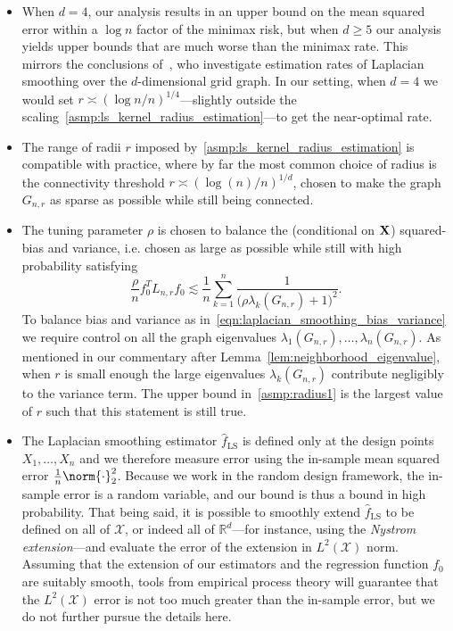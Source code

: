 \documentclass{article}
\newcommand{\Reals}{\mathbb{R}}
\newcommand{\1}{\mathbf{1}}
\newcommand{\Lap}{L}
\newcommand{\Xset}{\mathcal{X}}
\newcommand{\Leb}{L}
\newcommand{\wh}[1]{\widehat{#1}}
\newcommand{\LS}{\mathrm{LS}}
\theoremstyle{alden}
\theoremstyle{aldenthm}
\theoremstyle{definition}
\theoremstyle{remark}
\begin{document}
\begin{itemize}
	\item When $d = 4$, our analysis results in an upper bound on the mean squared error within a $\log n$ factor of the minimax risk, but when $d \geq 5$ our analysis yields upper bounds that are much worse than the minimax rate. This mirrors the conclusions of~\cite{sadhanala16}, who investigate estimation rates of Laplacian smoothing over the $d$-dimensional grid graph. In our setting, when $d = 4$ we would set $r \asymp (\log n/n)^{1/4}$---slightly outside the scaling~\ref{asmp:ls_kernel_radius_estimation}---to get the near-optimal rate.
	\item The range of radii $r$ imposed by~\ref{asmp:ls_kernel_radius_estimation} is  compatible with practice, where by far the most common choice of radius is the connectivity threshold $r \asymp (\log(n)/n)^{1/d}$, chosen to make the graph $G_{n,r}$ as sparse as possible while still being connected. 
	\item The tuning parameter $\rho$ is chosen to balance the (conditional on ${\bf X}$) squared-bias and variance, i.e. chosen as large as possible while still with high probability satisfying
	\begin{equation}
	\label{eqn:laplacian_smoothing_bias_variance}
	\frac{\rho}{n} f_0^T \Lap_{{n,r}} f_0 \lesssim \frac{1}{n}\sum_{k = 1}^{n} \frac{1}{\bigl(\rho \lambda_{k}(G_{n,r}) + 1\bigr)^2}.
	\end{equation}
	To balance bias and variance as in~\eqref{eqn:laplacian_smoothing_bias_variance} we require control on all the graph eigenvalues $\lambda_1(G_{n,r}),\ldots,\lambda_n(G_{n,r})$. As mentioned in our commentary after Lemma~\ref{lem:neighborhood_eigenvalue}, when $r$ is small enough the large eigenvalues $\lambda_k(G_{n,r})$ contribute negligibly to the variance term. The upper bound in~\ref{asmp:radius1} is the largest value of $r$ such that this statement is still true.
	\item The Laplacian smoothing estimator $\wh{f}_{\LS}$ is defined only at the design points $X_1,\ldots,X_n$ and we therefore measure error using the in-sample mean squared error $\frac{1}{n}\norm{\cdot}_2^2$. Because we work in the random design framework, the in-sample error is a random variable, and our bound is thus a bound in high probability. That being said, it is possible to smoothly extend $\wh{f}_{\LS}$ to be defined on all of $\Xset$, or indeed all of $\Reals^d$---for instance, using the \emph{Nystrom extension}---and evaluate the error of the extension in $\Leb^2(\Xset)$ norm. Assuming that the extension of our estimators and the regression function $f_0$ are suitably smooth, tools from empirical process theory will guarantee that the $\Leb^2(\Xset)$ error is not too much greater than the in-sample error, but we do not further pursue the details here.
\end{itemize}
\end{document}
